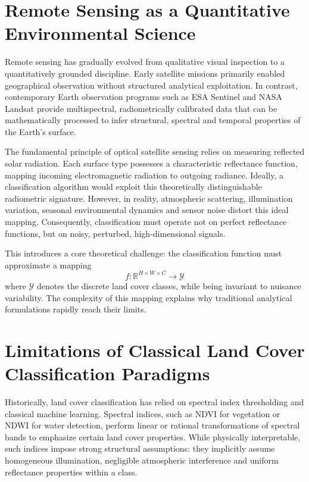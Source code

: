 \documentclass[12pt,a4paper]{report}
\begin{document}
\section{Remote Sensing as a Quantitative Environmental Science}

Remote sensing has gradually evolved from qualitative visual inspection to a quantitatively grounded discipline. Early satellite missions primarily enabled geographical observation without structured analytical exploitation. In contrast, contemporary Earth observation programs such as ESA Sentinel and NASA Landsat provide multispectral, radiometrically calibrated data that can be mathematically processed to infer structural, spectral and temporal properties of the Earth’s surface.

The fundamental principle of optical satellite sensing relies on measuring reflected solar radiation. Each surface type possesses a characteristic reflectance function, mapping incoming electromagnetic radiation to outgoing radiance. Ideally, a classification algorithm would exploit this theoretically distinguishable radiometric signature. However, in reality, atmospheric scattering, illumination variation, seasonal environmental dynamics and sensor noise distort this ideal mapping. Consequently, classification must operate not on perfect reflectance functions, but on noisy, perturbed, high-dimensional signals.

This introduces a core theoretical challenge: the classification function must approximate a mapping
\[
f: \mathbb{R}^{H\times W \times C} \rightarrow \mathcal{Y}
\]
where $\mathcal{Y}$ denotes the discrete land cover classes, while being invariant to nuisance variability. The complexity of this mapping explains why traditional analytical formulations rapidly reach their limits.

\section{Limitations of Classical Land Cover Classification Paradigms}

Historically, land cover classification has relied on spectral index thresholding and classical machine learning. Spectral indices, such as NDVI for vegetation or NDWI for water detection, perform linear or rational transformations of spectral bands to emphasize certain land cover properties. While physically interpretable, such indices impose strong structural assumptions: they implicitly assume homogeneous illumination, negligible atmospheric interference and uniform reflectance properties within a class.
\end{document}
